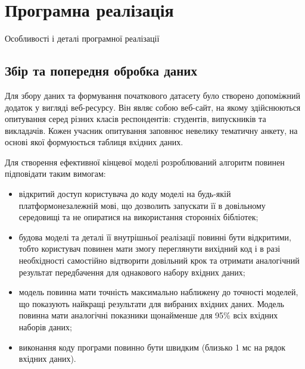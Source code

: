 \section{Програмна реалізація}
Особливості і деталі програмної реалізації

\subsection{Збір та попередня обробка даних}
Для збору даних та формування початкового датасету було створено допоміжний додаток у вигляді веб-ресурсу. Він являє собою веб-сайт, на якому здійснюються опитування серед різних класів респондентів: студентів, випускників та викладачів. Кожен учасник опитування заповнює невелику тематичну анкету, на основі якої формуюється таблиця вхідних даних. 

Для створення ефективної кінцевої моделі розроблюваний алгоритм повинен підповідати таким вимогам:
\begin{itemize}  
	\item відкритий доступ користувача до коду моделі на будь-якій платформонезалежній мові, що дозволить запускати її в довільному середовищі та не опиратися на використання сторонніх бібліотек;
	\item будова моделі та деталі її внутрішньої реалізації повинні бути відкритими, тобто користувач повинен мати змогу переглянути вихідний код і в разі необхідності самостійно відтворити довільний крок та отримати аналогічний результат передбачення для однакового набору вхідних даних;
	\item модель повинна мати точність максимально наближену до точності моделей, що показують найкращі результати для вибраних вхідних даних. Модель повинна мати аналогічні показники щонайменше для 95\% всіх вхідних наборів даних;
	\item виконання коду програми повинно бути швидким (близько 1 мс на рядок вхідних даних).
\end{itemize}
